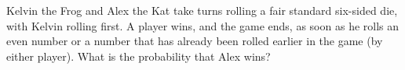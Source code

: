 Kelvin the Frog and Alex the Kat take turns rolling a fair standard six-sided die, with Kelvin rolling first. A player wins, and the game ends, as soon as he rolls an even number or a number that has already been rolled earlier in the game (by either player). What is the probability that Alex wins?
